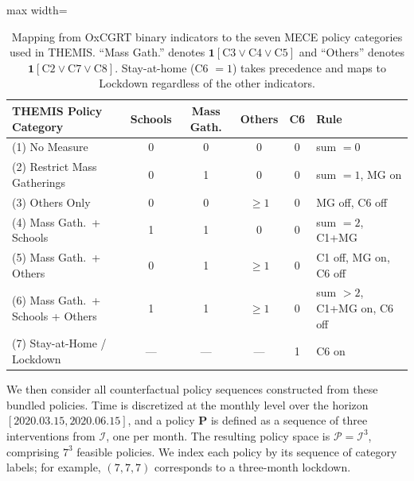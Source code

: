 \documentclass[msom,blindrev]{informs3} %
\newcommand{\rev}[1]{{\color{blue}#1}}
\begin{document}
{\begin{table}[h!]
	\centering
	{\color{blue}\small
		\begin{adjustbox}{max width=\textwidth}
			\begin{tabular}{|l|c|c|c|c|l|}
				\hline
				\textbf{THEMIS Policy Category} & \textbf{Schools} & \textbf{Mass Gath.} & \textbf{Others} & \textbf{C6} & \textbf{Rule} \\\hline
				(1) No Measure & 0 & 0 & 0 & 0 & sum $= 0$ \\
				(2) Restrict Mass Gatherings & 0 & 1 & 0 & 0 & sum $= 1$, MG on \\
				(3) Others Only & 0 & 0 & $\geq 1$ & 0 & MG off, C6 off \\
				(4) Mass Gath.\ + Schools & 1 & 1 & 0 & 0 & sum $= 2$, C1+MG \\
				(5) Mass Gath.\ + Others & 0 & 1 & $\geq 1$ & 0 & C1 off, MG on, C6 off \\
				(6) Mass Gath.\ + Schools + Others & 1 & 1 & $\geq 1$ & 0 & sum $> 2$, C1+MG on, C6 off \\
				(7) Stay-at-Home / Lockdown & --- & --- & --- & 1 & C6 on \\\hline
			\end{tabular}
		\end{adjustbox}
	}
	\caption{\rev{Mapping from OxCGRT binary indicators to the seven MECE policy categories used in THEMIS. ``Mass Gath.'' denotes $\mathbf{1}[\text{C3} \lor \text{C4} \lor \text{C5}]$ and ``Others'' denotes $\mathbf{1}[\text{C2} \lor \text{C7} \lor \text{C8}]$. Stay-at-home (C6 $=1$) takes precedence and maps to Lockdown regardless of the other indicators.}}
	\label{tab:oxford_mapping}
\end{table}
We then consider all counterfactual policy sequences constructed from these bundled policies. Time is discretized at the monthly level over the horizon $[2020.03.15, 2020.06.15]$, and a policy $\bm{P}$ is defined as a sequence of three interventions from $\mathcal{I}$, one per month. The resulting policy space is $\mathcal{P} = \mathcal{I}^3$, comprising $7^3$ feasible policies. We index each policy by its sequence of category labels; for example, $(7,7,7)$ corresponds to a three-month lockdown.}
\end{document}
